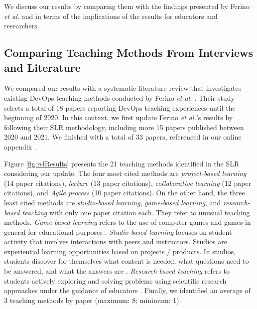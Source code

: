 \documentclass[10pt,conference]{IEEEtran}
\begin{document}
We discuss our results by comparing them with the findings presented by Ferino \textit{et al.} \cite{ferino:2021} and in terms of the implications of the results for educators and researchers.





\subsection{Comparing Teaching Methods From Interviews and Literature} 

We compared our results with a systematic literature review that investigates existing DevOps teaching methods conducted by Ferino \textit{et al.} \cite{ferino:2021}. Their study selects a total of 18 papers reporting DevOps teaching experiences until the beginning of 2020. In this context, we first update Ferino \textit{et al.}'s results \cite{ferino:2021} by following their SLR methodology, including more 15 papers published between 2020 and 2021.   We finished with a total of 33 papers, referenced in our online appendix \cite{researchArtifact}.

Figure \ref{fig:rslResults} presents the 21 teaching methods identified in the SLR considering our update. The four most cited methods are \textsl{project-based learning} (14 paper citations), \textsl{lecture} (13 paper citations), \textsl{collaborative learning} (12 paper citations), and \textsl{Agile process} (10 paper citations). On the other hand, the three least cited methods are \textsl{studio-based learning}, \textsl{game-based learning}, and \textsl{research-based teaching} with only one paper citation each. They refer to unusual teaching methods. \textsl{Game-based learning} refers to the use of computer games and games in general for educational purposes \cite{pivec:2003}. \textsl{Studio-based learning} focuses on student activity that involves interactions with peers and instructors. Studios are experiential learning opportunities based on projects / products. In studios, students discover for themselves what content is needed, what questions need to be answered, and what the answers are \cite{trede:2021}. \textsl{Research-based teaching} refers to students actively exploring and solving problems using scientific research approaches under the guidance of educators \cite{ye:2017}. Finally, we identified an average of 3 teaching methods by paper (maximum: 8; minimum: 1).  
\end{document}
